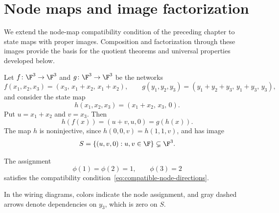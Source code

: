 
\section{Node maps and image factorization}\label{sec:general-node-maps}


We extend the node-map compatibility condition of the preceding chapter to state maps with proper images. Composition and factorization through these images provide the basis for the quotient theorems and universal properties developed below.

\begin{example}\label{ex:nonsurjective-node-map}
Let $f\colon\F^3\to\F^3$ and $g\colon\F^3\to\F^3$ be the networks
\[
    f(x_1,x_2,x_3)=(x_3,\,x_1+x_2,\,x_1+x_2),
    \qquad
    g(y_1,y_2,y_3)=(y_1+y_2+y_3,\,y_1+y_3,\,y_3),
\]
and consider the state map
\[
    h(x_1,x_2,x_3)=(x_1+x_2,\,x_3,\,0).
\]
Put $u=x_1+x_2$ and $v=x_3$. Then
\[
    h(f(x))=(u+v,u,0)=g(h(x)).
\]
The map $h$ is noninjective, since $h(0,0,v)=h(1,1,v)$, and has image
\[
    S=\{(u,v,0):u,v\in\F\}\subsetneq\F^3.
\]


The assignment
\[
    \phi(1)=\phi(2)=1,\qquad \phi(3)=2
\]
satisfies the compatibility condition~\eqref{eq:compatible-node-directions}.

In the wiring diagrams, colors indicate the node assignment, and gray dashed arrows denote dependencies on $y_3$, which is zero on $S$.
\begin{center}
    \begin{minipage}{0.45\linewidth}
        \centering


\end{minipage}
\end{center}
\end{example}
